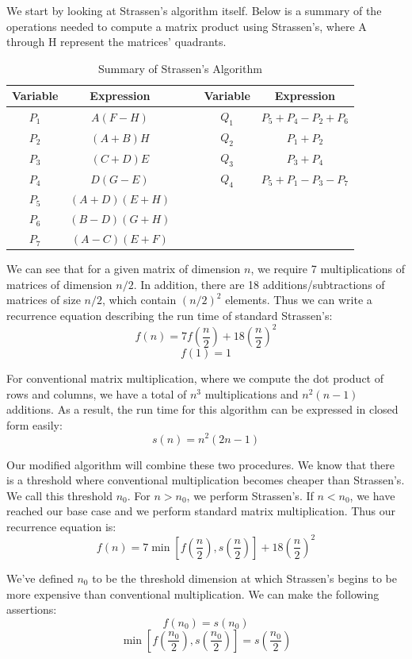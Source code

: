 \documentclass[12pt]{article}
\begin{document}
We start by looking at Strassen's algorithm itself. Below is a summary of the operations needed to compute a matrix product using Strassen's, where A through H represent the matrices' quadrants. \\

\begin{table}[h!]
\centering
{\setlength{\tabcolsep}{15pt}
\begin{tabular}{ c c c | c c c }
Variable & Expression &&& Variable & Expression\\ \hline
$P_1$ & $A(F-H)$ &&& $Q_1$ & $P_5+P_4-P_2+P_6$ \\
$P_2$ & $(A+B)H$ &&& $Q_2$ & $P_1+P_2$ \\
$P_3$ & $(C+D)E$ &&& $Q_3$ & $P_3+P_4$ \\
$P_4$ & $D(G-E)$ &&& $Q_4$ & $P_5+P_1-P_3-P_7$ \\
$P_5$ & $(A+D)(E+H)$ & \\
$P_6$ & $(B-D)(G+H)$ & \\
$P_7$ & $(A-C)(E+F)$ & \\
\end{tabular}}
\caption{Summary of Strassen's Algorithm
\label{T:Stra}}
\end{table}

We can see that for a given matrix of dimension $n$, we require 7 multiplications of matrices of dimension $n/2$. In addition, there are 18 additions/subtractions of matrices of size $n/2$, which contain $(n/2)^2$ elements. Thus we can write a recurrence equation describing the run time of standard Strassen's:
$$f(n) = 7f\left(\frac{n}{2}\right)+18\left(\frac{n}{2}\right)^2$$
$$f(1) = 1$$

For conventional matrix multiplication, where we compute the dot product of rows and columns, we have a total of $n^3$ multiplications and $n^2(n - 1)$ additions. As a result, the run time for this algorithm can be expressed in closed form easily:
$$s(n) = n^2(2n-1)$$

Our modified algorithm will combine these two procedures. We know that there is a threshold where conventional multiplication becomes cheaper than Strassen's. We call this threshold $n_0$. For $n > n_0$, we perform Strassen's. If $n < n_0$, we have reached our base case and we perform standard matrix multiplication. Thus our recurrence equation is:
$$f(n) = 7\min{\left[f\left(\frac{n}{2}\right),s\left(\frac{n}{2}\right)\right]}+18\left(\frac{n}{2}\right)^2$$

We've defined $n_0$ to be the threshold dimension at which Strassen's begins to be more expensive than conventional multiplication. We can make the following assertions:
$$f(n_0) = s(n_0)$$
$$\min{\left[f\left(\frac{n_0}{2}\right),s\left(\frac{n_0}{2}\right)\right]} = s\left(\frac{n_0}{2}\right)$$
\end{document}
